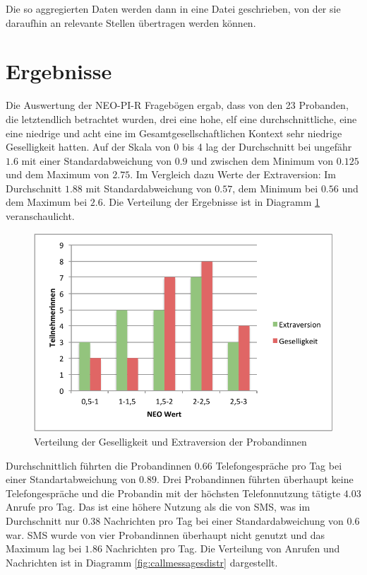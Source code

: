 Die so aggregierten Daten werden dann in eine Datei geschrieben, von der sie daraufhin an relevante Stellen übertragen werden können.

\section{Ergebnisse}

Die Auswertung der NEO-PI-R Fragebögen ergab, dass von den 23 Probanden, die letztendlich betrachtet wurden, drei eine hohe, elf eine durchschnittliche, eine eine niedrige und acht eine im Gesamtgesellschaftlichen Kontext sehr niedrige Geselligkeit hatten.
Auf der Skala von 0 bis 4 lag der Durchschnitt bei ungefähr $1.6$ mit einer Standardabweichung von $0.9$ und zwischen dem Minimum von $0.125$ 
und dem Maximum von $2.75$.
Im Vergleich dazu Werte der Extraversion:
Im Durchschnitt $1.88$ mit Standardabweichung von $0.57$, dem Minimum bei $0.56$ und dem Maximum bei $2.6$.
Die Verteilung der Ergebnisse ist in Diagramm \ref{fig:neoergebnisse} veranschaulicht.

\begin{figure}[h]
    \centering
    \includegraphics{images/NeoErgebnisse.pdf}
    \caption{Verteilung der Geselligkeit und Extraversion der Probandinnen}
    \label{fig:neoergebnisse}
\end{figure}

Durchschnittlich führten die Probandinnen $0.66$ Telefongespräche pro Tag bei einer Standartabweichung von $0.89$.
Drei Probandinnen führten überhaupt keine Telefongespräche und die Probandin mit der höchsten Telefonnutzung tätigte $4.03$ Anrufe pro Tag.
Das ist eine höhere Nutzung als die von SMS, was im Durchschnitt nur $0.38$ Nachrichten pro Tag bei einer Standardabweichung von $0.6$ war.
SMS wurde von vier Probandinnen überhaupt nicht genutzt und das Maximum lag bei $1.86$ Nachrichten pro Tag.
Die Verteilung von Anrufen und Nachrichten ist in Diagramm \ref{fig:callmessagesdistr} dargestellt.

